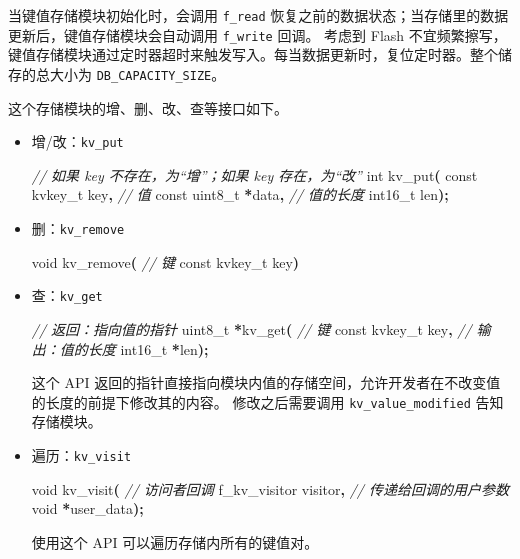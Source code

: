\documentclass[
  12pt,
]{book}
\newenvironment{Shaded}{\begin{snugshade}}{\end{snugshade}}
\newcommand{\CommentTok}[1]{\textcolor[rgb]{0.56,0.35,0.01}{\textit{#1}}}
\newcommand{\DataTypeTok}[1]{\textcolor[rgb]{0.13,0.29,0.53}{#1}}
\newcommand{\NormalTok}[1]{#1}
\newcommand{\OperatorTok}[1]{\textcolor[rgb]{0.81,0.36,0.00}{\textbf{#1}}}
\begin{document}
当键值存储模块初始化时，会调用 \texttt{f\_read} 恢复之前的数据状态；当存储里的数据更新后，键值存储模块会自动调用 \texttt{f\_write} 回调。
考虑到 Flash 不宜频繁擦写，键值存储模块通过定时器超时来触发写入。每当数据更新时，复位定时器。整个储存的总大小为
\texttt{DB\_CAPACITY\_SIZE}。

这个存储模块的增、删、改、查等接口如下。

\begin{itemize}
\item
  增/改：\texttt{kv\_put}

\begin{Shaded}
\begin{Highlighting}[]
\CommentTok{// 如果 key 不存在，为“增”；如果 key 存在，为“改”}
\DataTypeTok{int}\NormalTok{ kv\_put}\OperatorTok{(}
  \DataTypeTok{const}\NormalTok{ kvkey\_t key}\OperatorTok{,}
  \CommentTok{// 值}
  \DataTypeTok{const} \DataTypeTok{uint8\_t} \OperatorTok{*}\NormalTok{data}\OperatorTok{,}
  \CommentTok{// 值的长度}
  \DataTypeTok{int16\_t}\NormalTok{ len}\OperatorTok{);}
\end{Highlighting}
\end{Shaded}
\item
  删：\texttt{kv\_remove}

\begin{Shaded}
\begin{Highlighting}[]
\DataTypeTok{void}\NormalTok{ kv\_remove}\OperatorTok{(}
  \CommentTok{// 键}
  \DataTypeTok{const}\NormalTok{ kvkey\_t key}\OperatorTok{)}
\end{Highlighting}
\end{Shaded}
\item
  查：\texttt{kv\_get}

\begin{Shaded}
\begin{Highlighting}[]
\CommentTok{// 返回：指向值的指针}
\DataTypeTok{uint8\_t} \OperatorTok{*}\NormalTok{kv\_get}\OperatorTok{(}
  \CommentTok{// 键}
  \DataTypeTok{const}\NormalTok{ kvkey\_t key}\OperatorTok{,}
  \CommentTok{// 输出：值的长度}
  \DataTypeTok{int16\_t} \OperatorTok{*}\NormalTok{len}\OperatorTok{);}
\end{Highlighting}
\end{Shaded}

  这个 API 返回的指针直接指向模块内值的存储空间，允许开发者在不改变值的长度的前提下修改其的内容。
  修改之后需要调用 \texttt{kv\_value\_modified} 告知存储模块。
\item
  遍历：\texttt{kv\_visit}

\begin{Shaded}
\begin{Highlighting}[]
\DataTypeTok{void}\NormalTok{ kv\_visit}\OperatorTok{(}
  \CommentTok{// 访问者回调}
\NormalTok{  f\_kv\_visitor visitor}\OperatorTok{,}
  \CommentTok{// 传递给回调的用户参数}
  \DataTypeTok{void} \OperatorTok{*}\NormalTok{user\_data}\OperatorTok{);}
\end{Highlighting}
\end{Shaded}

  使用这个 API 可以遍历存储内所有的键值对。
\end{itemize}
\end{document}
